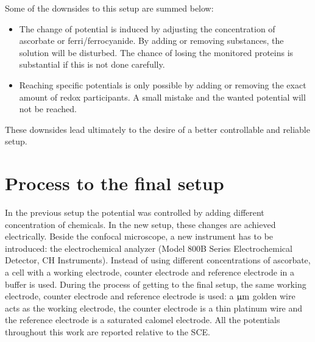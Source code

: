 \documentclass[twoside,single]{lion-msc}
\begin{document}
Some of the downsides to this setup are summed below:
\begin{itemize}
\item The change of potential is induced by adjusting the concentration of ascorbate or ferri/ferrocyanide. By adding or removing substances, the solution will be disturbed. The chance of losing the monitored proteins is substantial if this is not done carefully. 
\item Reaching specific potentials is only possible by adding or removing the exact amount of redox participants. A small mistake and the wanted potential will not be reached. 
\end{itemize}

These downsides lead ultimately to the desire of a better controllable and reliable setup. 

\section{Process to the final setup}

In the previous setup the potential was controlled by adding different concentration of chemicals. In the new setup, these changes are achieved electrically. Beside the confocal microscope, a new instrument has to be introduced: the electrochemical analyzer (Model 800B Series Electrochemical Detector, CH Instruments). Instead of using different concentrations of ascorbate, a cell with a working electrode, counter electrode and reference electrode in a buffer is used. During the process of getting to the final setup, the same working electrode, counter electrode and reference electrode is used: a $\upmu \textup{m}$ golden wire acts as the working electrode, the counter electrode is a  thin platinum wire and the reference electrode is a saturated calomel electrode. All the potentials throughout this work are reported relative to the SCE.
\end{document}
